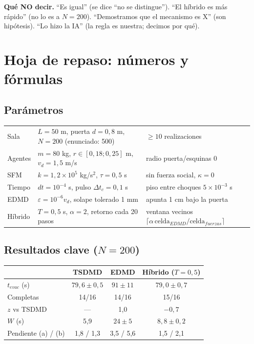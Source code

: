 \documentclass[10.5pt,a4paper]{article}
\newcommand{\tn}[2]{\ensuremath{#1\times10^{#2}}}
\begin{document}
\textbf{Qué NO decir.} ``Es igual'' (se dice ``no se distingue''). ``El híbrido es más rápido'' (no lo es a $N=200$). ``Demostramos que el mecanismo es X'' (son hipótesis). ``Lo hizo la IA'' (la regla es nuestra; decimos por qué).

\section{Hoja de repaso: números y fórmulas}

\subsection{Parámetros}
\begin{center}\small
\begin{tabular}{@{}lll@{}}
\toprule
Sala & $L=50$ m, puerta $d=0{,}8$ m, $N=200$ (enunciado: 500) & $\geq10$ realizaciones \\
Agentes & $m=80$ kg, $r\in[0{,}18;0{,}25]$ m, $v_d=1{,}5$ m/s & radio puerta/esquinas 0 \\
SFM & $k=\tn{1{,}2}{5}$ kg/s$^2$, $\tau=0{,}5$ s & sin fuerza social, $\kappa=0$ \\
Tiempo & $dt=10^{-4}$ s, pulso $\Delta t_c=0{,}1$ s & piso entre choques $5\times10^{-3}$ s \\
EDMD & $\varepsilon=10^{-6}v_d$, solape tolerado 1 mm & apunta 1 cm bajo la puerta \\
Híbrido & $T=0{,}5$ s, $\alpha=2$, retorno cada 20 pasos & ventana vecinos $\lceil\alpha\,\mathrm{celda}_{EDMD}/\mathrm{celda}_{fuerzas}\rceil$ \\ \bottomrule
\end{tabular}
\end{center}

\subsection{Resultados clave ($N=200$)}
\begin{center}\small
\begin{tabular}{@{}lccc@{}}
\toprule
& TSDMD & EDMD & Híbrido ($T=0{,}5$) \\ \midrule
$t_{evac}$ (s) & $79{,}6\pm0{,}5$ & $91\pm11$ & $79{,}0\pm0{,}7$ \\
Completas & 14/16 & 14/16 & 15/16 \\
$z$ vs TSDMD & --- & 1,0 & $-0{,}7$ \\
$W$ (s) & 5,9 & $24\pm5$ & $8{,}8\pm0{,}2$ \\
Pendiente (a) / (b) & 1,8 / 1,3 & 3,5 / 5,6 & 1,5 / 2,1 \\ \bottomrule
\end{tabular}
\end{center}
\end{document}
